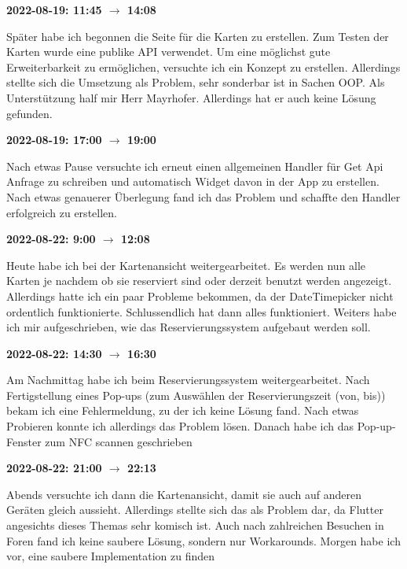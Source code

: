\vspace{0.5cm} \textbf{2022-08-19: 11:45 $\rightarrow$ 14:08}

Sp\"ater habe ich begonnen die Seite für die Karten zu erstellen. Zum
Testen der Karten wurde eine publike API verwendet. Um eine möglichst
gute Erweiterbarkeit zu ermöglichen, versuchte ich ein Konzept zu
erstellen. Allerdings stellte sich die Umsetzung als Problem, sehr
sonderbar ist in Sachen OOP. Als Unterstützung half mir Herr Mayrhofer.
Allerdings hat er auch keine Lösung gefunden.

\vspace{0.5cm} \textbf{2022-08-19: 17:00 $\rightarrow$ 19:00}

Nach etwas Pause versuchte ich erneut einen allgemeinen Handler für Get
Api Anfrage zu schreiben und automatisch Widget davon in der App zu
erstellen. Nach etwas genauerer Überlegung fand ich das Problem und
schaffte den Handler erfolgreich zu erstellen.

\vspace{0.5cm} \textbf{2022-08-22: 9:00 $\rightarrow$ 12:08}

Heute habe ich bei der Kartenansicht weitergearbeitet. Es werden nun
alle Karten je nachdem ob sie reserviert sind oder derzeit benutzt
werden angezeigt. Allerdings hatte ich ein paar Probleme bekommen, da der
DateTimepicker nicht ordentlich funktionierte. Schlussendlich hat dann
alles funktioniert. Weiters habe ich mir aufgeschrieben, wie das
Reservierungssystem aufgebaut werden soll.

\vspace{0.5cm} \textbf{2022-08-22: 14:30 $\rightarrow$ 16:30}

Am Nachmittag habe ich beim Reservierungssystem weitergearbeitet. Nach
Fertigstellung eines Pop-ups (zum Auswählen der Reservierungszeit
(von, bis)) bekam ich eine Fehlermeldung, zu der ich keine Lösung fand.
Nach etwas Probieren konnte ich allerdings das Problem lösen. Danach
habe ich das Pop-up-Fenster zum NFC scannen geschrieben

\vspace{0.5cm} \textbf{2022-08-22: 21:00 $\rightarrow$ 22:13}

Abends versuchte ich dann die Kartenansicht, damit sie auch auf anderen
Geräten gleich aussieht. Allerdings stellte sich das als Problem dar,
da Flutter angesichts dieses Themas sehr komisch ist. Auch nach
zahlreichen Besuchen in Foren fand ich keine saubere Lösung, sondern nur
Workarounds. Morgen habe ich vor, eine saubere Implementation zu finden

